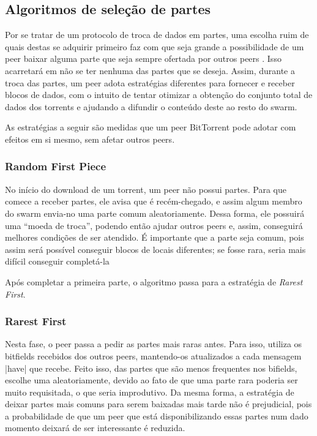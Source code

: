 
\newpage
\subsection*{Algoritmos de seleção de partes}

Por se tratar de um protocolo de troca de dados em partes, uma escolha ruim de quais
destas se adquirir primeiro faz com que seja grande a possibilidade de um \gls*{peer}
baixar alguma parte que seja sempre ofertada por outros \glspl*{peer}
\cite{artigo:bittorrent}. Isso acarretará em não se ter nenhuma das partes que se
deseja. Assim, durante a troca das partes, um \gls*{peer} adota estratégias diferentes
para fornecer e receber blocos de dados, com o intuito de tentar otimizar a obtenção do
conjunto total de dados dos \glspl*{torrent} e ajudando a difundir o conteúdo deste ao
resto do \gls*{swarm}.

As estratégias a seguir são medidas que um \gls*{peer} BitTorrent pode adotar com
efeitos em si mesmo, sem afetar outros \glspl*{peer}.

\subsubsection*{Random First Piece}

No início do download de um \gls*{torrent}, um \gls*{peer} não possui partes. Para que
comece a receber partes, ele avisa que é recém-chegado, e assim algum membro do
\gls*{swarm} envia-no uma parte comum aleatoriamente. Dessa forma, ele possuirá uma
``moeda de troca'', podendo então ajudar outros \glspl*{peer} e, assim, conseguirá
melhores condições de ser atendido. É importante que a parte seja comum, pois assim
será possível conseguir blocos de locais diferentes; se fosse rara, seria mais difícil
conseguir completá-la

Após completar a primeira parte, o algoritmo passa para a estratégia de \emph{Rarest
First}.

\subsubsection*{Rarest First}

Nesta fase, o \gls*{peer} passa a pedir as partes mais raras antes. Para isso, utiliza
os bitfields recebidos dos outros \glspl*{peer}, mantendo-os atualizados a cada mensagem
\bverb|have| que recebe. Feito isso, das partes que são menos frequentes nos bifields,
escolhe uma aleatoriamente, devido ao fato de que uma parte rara poderia ser muito
requisitada, o que seria improdutivo. Da mesma forma, a estratégia de deixar partes mais
comuns para serem baixadas mais tarde não é prejudicial, pois a probabilidade de que um
\gls*{peer} que está disponibilizando essas partes num dado momento deixará de ser
interessante é reduzida.

